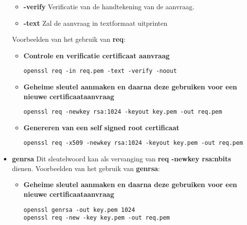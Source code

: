 \documentclass{report}
\begin{document}
\begin{itemize}
\begin{itemize}
				\item[] \textbf{-verify} Verificatie van de handtekening van de aanvraag.
				\item[] \textbf{-text} Zal de aanvraag in textformaat uitprinten
			\end{itemize}
		Voorbeelden van het gebruik van \textbf{req}:
		\begin{itemize}
			\item \textbf{Controle en verificatie certificaat aanvraag}
			\begin{lstlisting}
openssl req -in req.pem -text -verify -noout
			\end{lstlisting}
			\item \textbf{Geheime sleutel aanmaken en daarna deze gebruiken voor een nieuwe certificaataanvraag}
			\begin{lstlisting}
openssl req -newkey rsa:1024 -keyout key.pem -out req.pem
			\end{lstlisting}
			\item \textbf{Genereren van een self signed root certificaat}
			\begin{lstlisting}
openssl req -x509 -newkey rsa:1024 -keyout key.pem -out req.pem
			\end{lstlisting}
		\end{itemize}
	
	\item \textbf{genrsa\qquad} Dit sleutelwoord kan als vervanging van \textbf{req -newkey rsa:nbits} dienen.
			Voorbeelden van het gebruik van \textbf{genrsa}:
	\begin{itemize}
		\item \textbf{Geheime sleutel aanmaken en daarna deze gebruiken voor een nieuwe certificaataanvraag}
		\begin{lstlisting}
openssl genrsa -out key.pem 1024
openssl req -new -key key.pem -out req.pem
		\end{lstlisting}
	\end{itemize}
\end{itemize}
\end{document}
